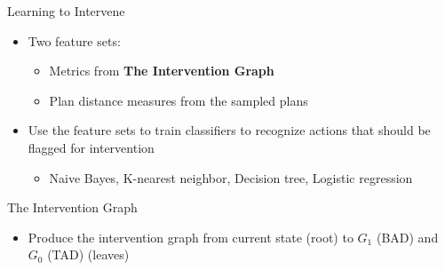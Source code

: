 \begin{frame}{Learning to Intervene}
\begin{itemize}
\item Two feature sets:
\begin{itemize}
\item Metrics from \textbf{The Intervention Graph}
\item Plan distance measures from the sampled plans
\end{itemize}
\item Use the feature sets to train classifiers to recognize actions that should be flagged for intervention
\begin{itemize}
\item Naive Bayes, K-nearest neighbor, Decision tree, Logistic regression
\end{itemize}
\end{itemize}

\end{frame}


\begin{frame}{The Intervention Graph}
\begin{itemize}
\item Produce the intervention graph from current state (root) to $G_1$ (BAD) and $G_0$ (TAD) (leaves)
\end{itemize}

\begin{figure}[tb]
\end{figure} 

\end{frame}


